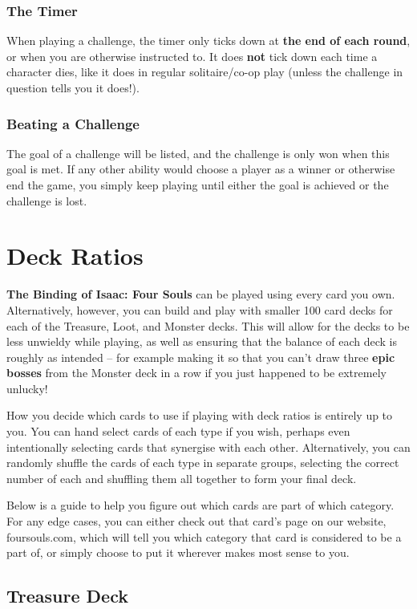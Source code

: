 \documentclass[
  fontsize=10pt,
  paper=a5,
  version=last,
  chapterprefix=true,
  bindingoffset=5mm,
  ]{scrbook}
\begin{document}
    \subsection*{The Timer}
    When playing a challenge, the timer only ticks down at \textbf{the end of each round}, or when you are otherwise instructed to. It does \textbf{not} tick down each time a character dies, like it does in regular solitaire/co-op play (unless the challenge in question tells you it does!).

    \subsection*{Beating a Challenge}
    The goal of a challenge will be listed, and the challenge is only won when this goal is met. If any other ability would choose a player as a winner or otherwise end the game, you simply keep playing until either the goal is achieved or the challenge is lost.

    \chapter{Deck Ratios}
    \textbf{The Binding of Isaac: Four Souls} can be played using every card you own. Alternatively, however, you can build and play with smaller 100 card decks for each of the Treasure, Loot, and Monster decks. This will allow for the decks to be less unwieldy while playing, as well as ensuring that the balance of each deck is roughly as intended – for example making it so that you can’t draw three \textbf{epic bosses} from the Monster deck in a row if you just happened to be extremely unlucky!

    How you decide which cards to use if playing with deck ratios is entirely up to you. You can hand select cards of each type if you wish, perhaps even intentionally selecting cards that synergise with each other. Alternatively, you can randomly shuffle the cards of each type in separate groups, selecting the correct number of each and shuffling them all together to form your final deck.

    Below is a guide to help you figure out which cards are part of which category. For any edge cases, you can either check out that card’s page on our website, foursouls.com, which will tell you which category that card is considered to be a part of, or simply choose to put it wherever makes most sense to you.

    \section{Treasure Deck}
\end{document}
